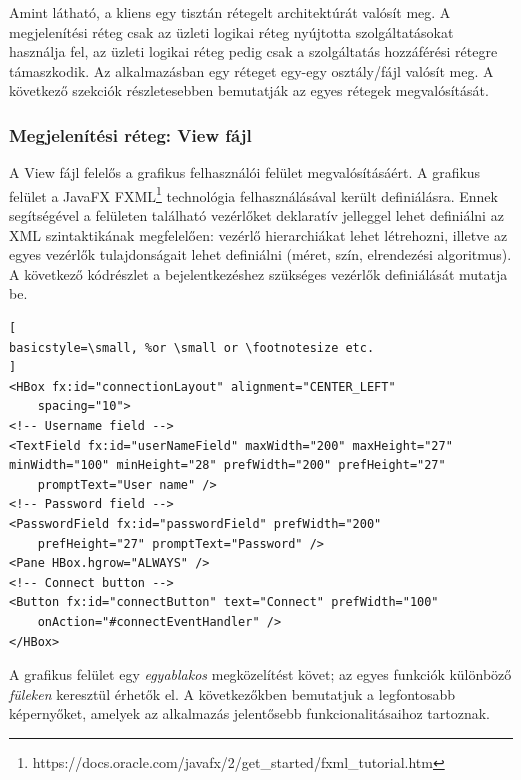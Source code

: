 \documentclass[11pt, a4paper]{article}
\begin{document}
	Amint látható, a kliens egy tisztán rétegelt architektúrát valósít meg. A megjelenítési réteg csak az üzleti logikai réteg  nyújtotta szolgáltatásokat használja fel, az üzleti logikai réteg pedig csak a szolgáltatás hozzáférési rétegre támaszkodik. Az alkalmazásban egy réteget egy-egy osztály/fájl valósít meg. A következő szekciók részletesebben bemutatják az egyes rétegek megvalósítását.
     
     \subsubsection{Megjelenítési réteg: View fájl}
     A View fájl felelős a grafikus felhasználói felület megvalósításáért. A grafikus felület a JavaFX FXML\footnote{https://docs.oracle.com/javafx/2/get\_started/fxml\_tutorial.htm} technológia felhasználásával került definiálásra. Ennek segítségével a felületen található vezérlőket deklaratív jelleggel lehet definiálni az XML szintaktikának megfelelően: vezérlő hierarchiákat lehet létrehozni, illetve az egyes vezérlők tulajdonságait lehet definiálni (méret, szín, elrendezési algoritmus). A következő kódrészlet a bejelentkezéshez szükséges vezérlők definiálását mutatja be.
     
\begin{lstlisting}[
basicstyle=\small, %or \small or \footnotesize etc.
]
<HBox fx:id="connectionLayout" alignment="CENTER_LEFT"
	spacing="10">
<!-- Username field -->
<TextField fx:id="userNameField" maxWidth="200" maxHeight="27"
minWidth="100" minHeight="28" prefWidth="200" prefHeight="27" 
	promptText="User name" />	
<!-- Password field -->
<PasswordField fx:id="passwordField" prefWidth="200" 
	prefHeight="27" promptText="Password" />	
<Pane HBox.hgrow="ALWAYS" />
<!-- Connect button -->			
<Button fx:id="connectButton" text="Connect" prefWidth="100" 
	onAction="#connectEventHandler" />
</HBox>
\end{lstlisting}
     
     A grafikus felület egy \emph{egyablakos} megközelítést követ; az egyes funkciók különböző \emph{füleken} keresztül érhetők el. A következőkben bemutatjuk a legfontosabb képernyőket, amelyek az alkalmazás jelentősebb funkcionalitásaihoz tartoznak.
     
\end{document}
